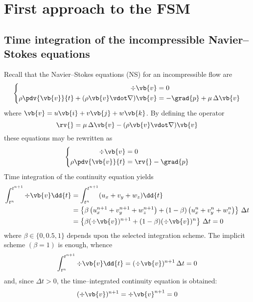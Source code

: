 
\section{First approach to the FSM}

\subsection{Time integration of the incompressible Navier--Stokes equations}

Recall that the Navier--Stokes equations (NS) for an incompressible flow are
\begin{equation}
    \left\{
        \begin{aligned}
            \div{\vb{v}} &= 0 \\
            \rho \pdv{\vb{v}}{t} + (\rho \vb{v} \vdot \nabla) \vb{v} &=
            -\grad{p} + \mu \, \Delta \vb{v}
        \end{aligned}
    \right.
\end{equation}
where $\vb{v} = u \vb{i} + v \vb{j} + w \vb{k}$. By defining the operator
\begin{equation*}
    \rv{} = \mu \, \Delta \vb{v} - (\rho \vb{v} \vdot \nabla) \vb{v}
\end{equation*}
these equations may be rewritten as
\begin{equation}
    \left\{
        \begin{aligned}
            \div{\vb{v}} &= 0                                   \\
            \rho \pdv{\vb{v}}{t} &= \rv{} - \grad{p}
        \end{aligned}
    \right.
\end{equation}
Time integration of the continuity equation yields
\begin{align*}
    \int_{t^n}^{t^{n+1}} \div{\vb{v}} \dd{t} &=
    \int_{t^n}^{t^{n+1}} (u_x + v_y + w_z) \dd{t} \\ &=
    \left\{ \beta \left( u_x^{n+1} + v_y^{n+1} + w_z^{n+1} \right) +
    (1 - \beta) \left( u_x^{n} + v_y^{n} + w_z^{n} \right) \right\} \, \Delta t \\ &=
    \left\{ \beta (\div{\vb{v}})^{n+1} + (1 - \beta) (\div{\vb{v}})^{n} \right\} \, \Delta t = 0
\end{align*}
where $\beta \in \{ 0, 0.5, 1 \}$ depends upon the selected integration scheme.
The implicit scheme $(\beta = 1)$ is enough, whence
\begin{equation*}
    \int_{t^n}^{t^{n+1}} \div{\vb{v}} \dd{t} =
    (\div{\vb{v}})^{n+1} \, \Delta t = 0
\end{equation*}
and, since $\Delta t > 0$, the time--integrated continuity equation is obtained:
\begin{equation} \label{eq:time_integrated_continuity_equation}
    (\div{\vb{v}})^{n+1} = \div{\vb{v}^{n+1}} = 0
\end{equation}


